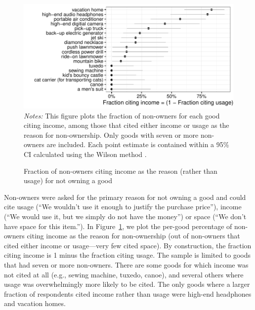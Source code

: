 \documentclass[12pt]{article}
\begin{document}
\begin{figure}
\centering 
\caption{Fraction of non-owners citing income as the reason (rather than usage) for not owning a good} 
\label{fig:reasons}
\begin{minipage}{0.9 \linewidth}
    \includegraphics[width = \linewidth]{./plots/reasons.pdf} \\
    {\footnotesize
  \emph{Notes:} This figure plots the fraction of non-owners for each good citing income, among those that cited either income or usage as the reason for non-ownership.
  Only goods with seven or more non-owners are included.
  Each point estimate is contained within a 95\% CI calculated using the Wilson method \citep{wilson1927}. 
  }
\end{minipage} 
\end{figure} 

Non-owners were asked for the primary reason for not owning a good and could cite usage (``We wouldn't use it enough to justify the purchase price''), income  (``We would use it, but we simply do not have the money'') or space (``We don't have space for this item.'').
In Figure~\ref{fig:reasons}, we plot the per-good percentage of non-owners citing income as the reason for non-ownership (out of non-owners that cited either income or usage---very few cited space).
By construction, the fraction citing income is 1 minus the fraction citing usage. 
The sample is limited to goods that had seven or more non-owners. 
There are some goods for which income was not cited at all (e.g., sewing machine, tuxedo, canoe), and several others where usage was overwhelmingly more likely to be cited.
The only goods where a larger fraction of respondents cited income rather than usage were high-end headphones and vacation homes. 
\end{document}
